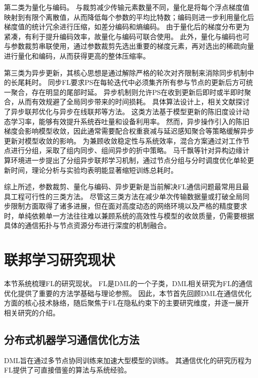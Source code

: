 \documentclass[master, vlined]{DissertUESTC}
\begin{document}
	第二类为量化与编码。
	与裁剪减少传输元素数量不同，量化是将每个浮点梯度值映射到有限个离散值，从而降低每个参数的平均比特数；编码则进一步利用量化后梯度值的统计冗余进行压缩，如差分编码和熵编码。
	由于量化后的梯度分布更为紧凑，有利于提升编码效率，故量化与编码可联合使用。
	此外，量化与编码也可与参数裁剪串联使用，通过参数裁剪先选出重要的梯度元素，再对选出的稀疏向量进行量化和编码，从而获得更高的整体压缩率。

	第三类为异步更新，其核心思想是通过解除严格的轮次对齐限制来消除同步机制中的长尾耗时。
	同步FL要求PS在每轮迭代中必须集齐所有参与节点的更新后方可统一聚合，存在明显的尾部时延。
	异步机制则允许PS在收到更新后即时或半即时聚合，从而有效规避了全局同步带来的时间损耗。
	具体算法设计上，相关文献探讨了异步联邦优化与异步在线联邦等方法。
	这类方法基于模型更新的陈旧度设计动态学习率，能够有效提升系统吞吐量和设备利用率。
	然而，异步操作引入的陈旧梯度会影响模型收敛，因此通常需要配合权重衰减与延迟感知聚合等策略缓解异步更新对模型收敛的影响。
	为兼顾收敛稳定性与系统效率，混合方案通过对工作节点进行分组，采取了组内同步、组间异步的折中策略。
	马千飘等针对异构边缘计算环境进一步提出了分组异步联邦学习机制，通过节点分组与分时调度优化单轮更新时间，理论分析与实验均表明能显著缩短训练总耗时。

	综上所述，参数裁剪、量化与编码、异步更新是当前解决FL通信问题最常用且最具工程可行性的三类方法。
	尽管这三类方法在减少单次传输数据量或打破全局同步限制方面取得了诸多进展，但在面对高度动态的网络环境以及严格的精度要求时，单纯依赖单一方法往往难以兼顾系统的高效性与模型的收敛质量，仍需要根据具体的通信拓扑与节点资源分布进行深度的机制融合。

	\section{联邦学习研究现状}

	本节系统梳理FL的研究现状。
	FL是DML的一个子类，DML相关研究为FL的通信优化提供了重要的方法学基础与理论参照。
	因此，本节首先回顾DML在通信优化方面的核心技术脉络，随后聚焦于FL在隐私约束下的主要研究维度，并逐一展开相关研究的介绍。

	\subsection{分布式机器学习通信优化方法}

	DML旨在通过多节点协同训练来加速大型模型的训练。
	其通信优化的研究历程为FL提供了可直接借鉴的算法与系统经验。
\end{document}
